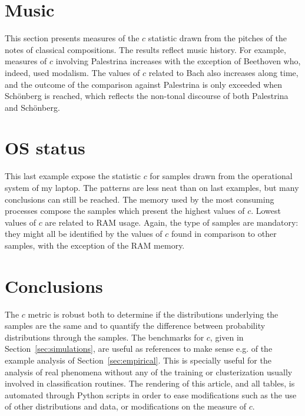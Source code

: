 \documentclass[%
	aip,
	jmp,%
	amsmath,amssymb,
	reprint,%
]{revtex4-1}
\begin{document}



\FloatBarrier
\section{Music}
This section presents measures of the $c$ statistic drawn
from the pitches of the notes of classical compositions.
The results reflect music history.
For example, measures of $c$ involving Palestrina
increases with the exception of Beethoven
who, indeed, used modalism.
The values of $c$ related to Bach also increases along time,
and the outcome of the comparison against Palestrina 
is only exceeded when Sch\"onberg is reached,
which reflects the non-tonal discourse of both
Palestrina and Sch\"onberg.





\FloatBarrier
\section{OS status}
This last example expose the statistic $c$ for samples drawn from
the operational system of my laptop.
The patterns are less neat than on last examples,
but many conclusions can still be reached.
The memory used by the most consuming processes compose
the samples which present the highest values of $c$.
Lowest values of $c$ are related to RAM usage.
Again, the type of samples are mandatory:
they might all be identified by the values of $c$
found in comparison to other samples,
with the exception of the RAM memory.



\FloatBarrier
\section{Conclusions}\label{sec:conc}
The $c$ metric is robust both to determine if
the distributions underlying the samples are the same
and to quantify the difference between probability distributions
through the samples.
The benchmarks for $c$, given in Section~\ref{sec:simulations},
are useful as references to make sense e.g. of the example analysis
of Section~\ref{sec:empirical}.
This is specially useful for the analysis of real phenomena
without any of the training or clusterization usually involved in
classification routines.
The rendering of this article, and all tables,
is automated through Python scripts in order to ease modifications
such as the use of other distributions
and data, or modifications on the measure of $c$.
\end{document}

